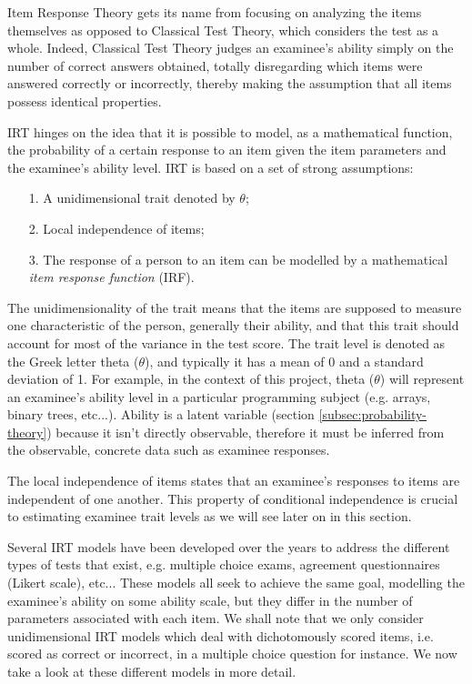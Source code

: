 Item Response Theory gets its name from focusing on analyzing the items themselves  as opposed to Classical Test Theory, which considers the test as a whole. Indeed, Classical Test Theory judges an examinee's ability simply on the number of correct answers obtained, totally disregarding which items were answered correctly or incorrectly, thereby making the assumption that all items possess identical properties. \newline

IRT hinges on the idea that it is possible to model, as a mathematical function, the probability of a certain response to an item given the item parameters and the examinee's ability level. IRT is based on a set of strong assumptions\cite{IRT-Wiki}:

\begin{itemize}
\item[1.] A unidimensional trait denoted by $\theta$;
\item[2.] Local independence of items;
\item[3.] The response of a person to an item can be modelled by a mathematical \textit{item response function} (IRF).
\end{itemize}

The unidimensionality of the trait means that the items are supposed to measure one characteristic of the person, generally their ability, and that this trait should account for most of the variance in the test score. The trait level is denoted as the Greek letter theta ($\theta$), and typically it has a mean of 0 and a standard deviation of 1. For example, in the context of this project, theta ($\theta$) will represent an examinee's ability level in a particular programming subject (e.g. arrays, binary trees, etc...). Ability is a latent variable (section \ref{subsec:probability-theory}) because it isn't directly observable, therefore it must be inferred from the observable, concrete data such as examinee responses. \newline

The local independence of items states that an examinee's responses to items are independent of one another. This property of conditional independence is crucial to estimating examinee trait levels as we will see later on in this section.\newline

Several IRT models have been developed over the years to address the different types of tests that exist, e.g. multiple choice exams, agreement questionnaires (Likert scale), etc... These models all seek to achieve the same goal, modelling the examinee's ability on some ability scale, but they differ in the number of parameters associated with each item. We shall note that we only consider unidimensional IRT models which deal with dichotomously scored items, i.e. scored as correct or incorrect, in a multiple choice question for instance. We now take a look at these different models in more detail.

